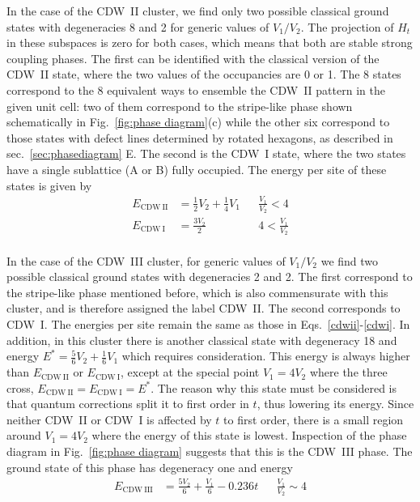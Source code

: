 \documentclass[aps,prx,10pt,twocolumn,floatfix,superscriptaddress,showpacs,numerical,footinbib]{revtex4-1}
\begin{document}
In the case of the CDW~II cluster, we find only two possible classical ground states with degeneracies 8 and 2 for generic values of $V_1/V_2$. 
% 
The projection of $H_t$ in these subspaces is zero for both cases, which means that both are stable strong coupling phases.
%
The first can be identified with the classical version of the CDW~II state, where the two values of the occupancies are 0 or 1.
%
The 8 states correspond to the 8 equivalent ways to ensemble the CDW~II pattern in the given unit cell: two of them correspond to the stripe-like phase
shown schematically in Fig.~\ref{fig:phase diagram}(c) while the other six correspond to those states with defect lines determined by rotated hexagons, as described in sec.~\ref{sec:phasediagram} E. 
%
The second is the CDW~I state, where the two states have a single sublattice (A or B) fully occupied. The energy per site of these states is given by
%
\begin{align}
E_{\mathrm{CDW~II}} &= \frac{1}{2}V_2 + \frac{1}{4}V_1 & & \tfrac{V_1}{V_2} < 4 \label{cdwii} \\
E_{\mathrm{CDW~I}} &= \frac{3V_2}{2}   & & 4 < \tfrac{V_1}{V_2}\label{cdwi}
\end{align}
\\
%
In the case of the CDW~III cluster, for generic values of $V_1/V_2$ we find two possible classical ground states with degeneracies 2 and 2. 
%
The first correspond to the stripe-like phase mentioned before, which is also commensurate with this cluster, and is therefore assigned the label CDW~II. The second corresponds to CDW~I. The energies per site remain the same as those in Eqs.~\ref{cdwii}-\ref{cdwi}. 
%
In addition, in this cluster there is another classical state with degeneracy 18 and energy $E^*=\frac{5}{6}V_2 + \frac{1}{6}V_1$ which requires consideration.  
%
This energy is always higher than $E_{\mathrm{CDW~II}}$ or $E_{\mathrm{CDW~I}}$, except at the special point $V_1=4V_2$ where the three cross, $E_{\mathrm{CDW~II}}=E_{\mathrm{CDW~I}}=E^*$. 
%
The reason why this state must be considered is that quantum corrections split it to first order in $t$, thus lowering its energy. Since neither CDW~II or CDW~I is affected by $t$ to first order, there is a small region around $V_1=4V_2$ where the energy of this state is lowest. 
%
Inspection of the phase diagram in Fig.~\ref{fig:phase diagram} suggests that this is the CDW~III phase. The ground state of this phase has degeneracy one and energy
%
\begin{align}
E_{\mathrm{CDW~III}} &= \frac{5V_2}{6} + \frac{V_1}{6} - 0.236t   & & \tfrac{V_1}{V_2} \sim 4 \label{cdwiii}
\end{align}
\end{document}
